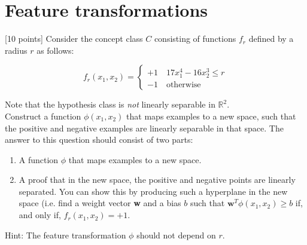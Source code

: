 \section{Feature transformations}\label{sec:q2}

[10 points] Consider the concept class $C$ consisting of functions $f_r$ defined by a radius $r$ as follows:

\begin{equation*}
            f_r(x_1,x_2) = \begin{cases}
                +1 \quad 17x_1^4-16x_2^3\leq r \\
                -1 \quad \text{otherwise}
            \end{cases}
            \label{eq-0}
        \end{equation*}

Note that the hypothesis class is \textit{not} linearly separable in $\mathbb{R}^2$.\\

Construct a function $\phi(x_1,x_2)$ that maps examples to a new space, such that the positive and negative examples are linearly separable in that space. The answer to this question should consist of two parts: 
\begin{enumerate}
\item A function $\phi$ that maps examples to a new space.
\item A proof that in the new space, the positive and negative points are linearly separated. You can show this by producing such a hyperplane in the new space (i.e. find a weight vector \textbf{w} and a bias $b$ such that $\textbf{w}^T\phi(x_1,x_2)\geq b$ if, and only if, $f_r(x_1,x_2)=+1$.
\end{enumerate}
Hint: The feature transformation $\phi$ should not depend on $r$.

